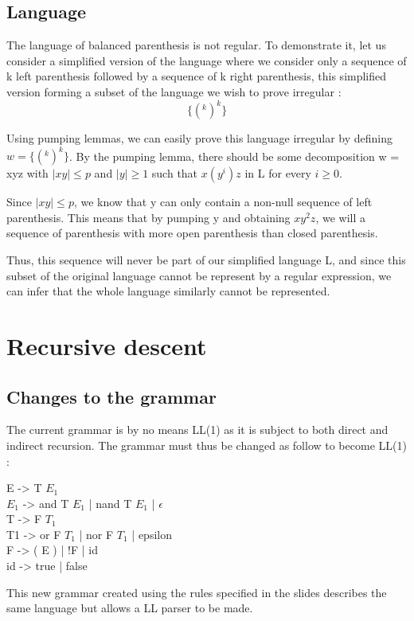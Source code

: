 \documentclass[a4paper, 11pt]{article}
\begin{document}
    \subsection{Language}

    	The language of balanced parenthesis is not regular.
    	To demonstrate it, let us consider a simplified version of the language
    	where we consider only a sequence of k left parenthesis followed by
    	a sequence of k right parenthesis, this simplified version forming
    	a subset of the language we wish to prove irregular :
    	\newline
    	$$\{(^k )^k\}$$

    	Using pumping lemmas, we can easily prove this language irregular by defining
    	$w = \{(^k )^k\}$. By the pumping lemma, there should be some decomposition
    	w = xyz with $|xy| \le p$ and $|y| \ge 1$ such that $x(y^i)z$
    	in L for every $i \ge 0$. \newline

    	Since $|xy| \le p$, we know that y can only contain a non-null sequence of
    	left parenthesis. This means that by pumping y and obtaining $xy^2 z$, we will
    	a sequence of parenthesis with more open parenthesis than closed parenthesis.
    	\newline

    	Thus, this sequence will never be part of our simplified language L, and since
    	this subset of the original language cannot be represent by a regular expression,
    	we can infer that the whole language similarly cannot be represented.

    \section{Recursive descent}
    \subsection{Changes to the grammar}

    	The current grammar is by no means LL(1) as it is subject to both direct and
    	indirect recursion. The grammar must thus be changed as follow to become LL(1) :
    	\newline

    	\begin{flushleft}
    	E -> T $E_1$ \\
    	$E_1$ -> and T $E_1$ | nand T $E_1$ | $\epsilon$ \\
    	T -> F $T_1$ \\
		T1 -> or F $T_1$ | nor F $T_1$ | epsilon \\
		F -> ( E ) | !F | id \\
		id -> true | false \\
		\end{flushleft}

    	This new grammar created using the rules specified in the slides describes
    	the same language but allows a LL parser to be made.
\end{document}
